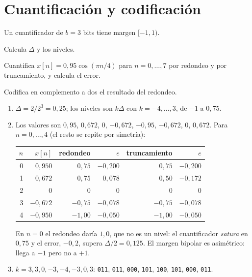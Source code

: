\documentclass[11pt,a4paper]{scrartcl}
\begin{document}
\section*{Cuantificación y codificación}

\begin{ejercicio}
  Un cuantificador de $b=3$ bits tiene margen $[-1,1)$.
  \begin{incisos}[1]
    \item Calcula $\Delta$ y los niveles.
    \item Cuantifica $x[n]=0{,}95\cos(\pi n/4)$ para $n=0,\dots,7$ por redondeo y por truncamiento, y calcula el error.
    \item Codifica en complemento a dos el resultado del redondeo.
  \end{incisos}
\end{ejercicio}
\begin{solucion}
  \begin{enumerate}[label=\alph*)]
    \item $\Delta=2/2^3=0{,}25$; los niveles son $k\Delta$ con $k=-4,\dots,3$, de $-1$ a $0{,}75$.
    \item Los valores son $0{,}95$, $0{,}672$, $0$, $-0{,}672$, $-0{,}95$, $-0{,}672$, $0$, $0{,}672$. Para $n=0,\dots,4$ (el resto se repite por simetría):
    \begin{center}
      \begin{tabular}{@{}rrrrrr@{}}
        \toprule
        $n$ & $x[n]$ & redondeo & $e$ & truncamiento & $e$\\\midrule
        0 & $0{,}950$ & $0{,}75$ & $-0{,}200$ & $0{,}75$ & $-0{,}200$\\
        1 & $0{,}672$ & $0{,}75$ & $0{,}078$ & $0{,}50$ & $-0{,}172$\\
        2 & $0$ & $0$ & $0$ & $0$ & $0$\\
        3 & $-0{,}672$ & $-0{,}75$ & $-0{,}078$ & $-0{,}75$ & $-0{,}078$\\
        4 & $-0{,}950$ & $-1{,}00$ & $-0{,}050$ & $-1{,}00$ & $-0{,}050$\\\bottomrule
      \end{tabular}
    \end{center}
    En $n=0$ el redondeo daría $1{,}0$, que no es un nivel: el cuantificador \emph{satura} en $0{,}75$ y el error, $-0{,}2$, supera $\Delta/2=0{,}125$. El margen bipolar es asimétrico: llega a $-1$ pero no a $+1$.
    \item $k=3,3,0,-3,-4,-3,0,3$: \texttt{011}, \texttt{011}, \texttt{000}, \texttt{101}, \texttt{100}, \texttt{101}, \texttt{000}, \texttt{011}.
  \end{enumerate}
\end{solucion}
\end{document}
